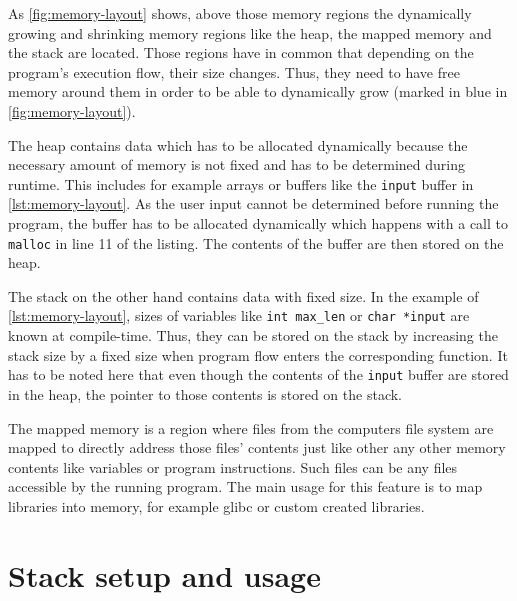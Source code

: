 As \cref{fig:memory-layout} shows, above those memory regions the dynamically growing and shrinking memory regions like the heap, the mapped memory and the stack are located.
Those regions have in common that depending on the program's execution flow, their size changes.
Thus, they need to have free memory around them in order to be able to dynamically grow (marked in blue in \cref{fig:memory-layout}).

The heap contains data which has to be allocated dynamically because the necessary amount of memory is not fixed and has to be determined during runtime.
This includes for example arrays or buffers like the \texttt{input} buffer in \cref{lst:memory-layout}.
As the user input cannot be determined before running the program, the buffer has to be allocated dynamically which happens with a call to \texttt{malloc} in line 11 of the listing.
The contents of the buffer are then stored on the heap.

The stack on the other hand contains data with fixed size.
In the example of \cref{lst:memory-layout}, sizes of variables like \texttt{int max\_len} or \texttt{char *input} are known at compile-time.
Thus, they can be stored on the stack by increasing the stack size by a fixed size when program flow enters the corresponding function.
It has to be noted here that even though the contents of the \texttt{input} buffer are stored in the heap, the pointer to those contents is stored on the stack.

The mapped memory is a region where files from the computers file system are mapped to directly address those files' contents just like other any other memory contents like variables or program instructions.
Such files can be any files accessible by the running program.
The main usage for this feature is to map libraries into memory, for example \gls{glibc} or custom created libraries.



\section{Stack setup and usage}
\label{sec:stack-setup-and-usage}

